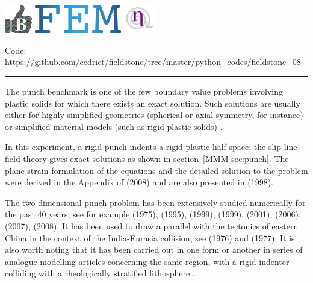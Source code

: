 \includegraphics[height=1.25cm]{images/pictograms/benchmark}
\includegraphics[height=1.25cm]{images/pictograms/FEM}
\includegraphics[height=1.25cm]{images/pictograms/nonlinear}




\begin{center}
\inpython
{\small Code: \url{https://github.com/cedrict/fieldstone/tree/master/python_codes/fieldstone_08}}
\end{center}

\par\noindent\rule{\textwidth}{0.4pt}

The punch benchmark is one of the few boundary value problems involving plastic solids for 
which there exists an exact solution. 
Such solutions are usually either for highly simplified geometries (spherical or axial 
symmetry, for instance) or simplified material models (such as rigid plastic solids) \cite{kacha04}.

In this experiment, a rigid punch indents a rigid plastic half space; the slip line field theory gives 
exact solutions as shown in section~\ref{MMM-sec:punch}. 
The plane strain formulation of the equations and the detailed solution to the 
problem were derived in the Appendix of \textcite{thfb08} (2008) and are also presented in 
\textcite{gepd98} (1998).

The two dimensional punch problem has been extensively studied numerically for the past 40 years,
see for example
\textcite{zihl75} (1975),
\textcite{zihp95} (1995),
\textcite{chan99} (1999),
\textcite{huhy99} (1999),
\textcite{chpe01} (2001),
\textcite{yuti06} (2006),
\textcite{raab07} (2007),
\textcite{bufs08} (2008).
It has been used to draw a parallel 
with the tectonics of eastern China in the context of the 
India-Eurasia collision, see \textcite{tamo76} (1976) and \textcite{mota77} (1977).
It is also worth noting that it has been carried out in one form or another in series of 
analogue modelling articles 
concerning the same region, with a rigid indenter colliding with a rheologically stratified 
lithosphere \cite{peta88,daco88,jodc90}.
 
